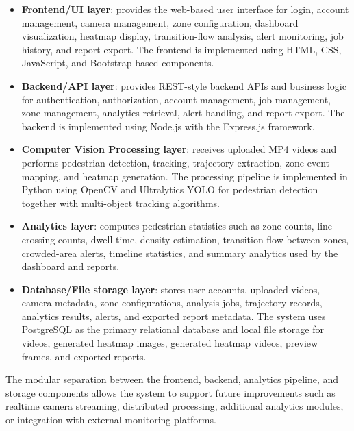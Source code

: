 \documentclass[12pt,a4paper]{report}
\begin{document}
\begin{itemize}

    \item \textbf{Frontend/UI layer}: provides the web-based user interface for login, account management, camera management, zone configuration, dashboard visualization, heatmap display, transition-flow analysis, alert monitoring, job history, and report export. The frontend is implemented using HTML, CSS, JavaScript, and Bootstrap-based components.

    \item \textbf{Backend/API layer}: provides REST-style backend APIs and business logic for authentication, authorization, account management, job management, zone management, analytics retrieval, alert handling, and report export. The backend is implemented using Node.js with the Express.js framework.

    \item \textbf{Computer Vision Processing layer}: receives uploaded MP4 videos and performs pedestrian detection, tracking, trajectory extraction, zone-event mapping, and heatmap generation. The processing pipeline is implemented in Python using OpenCV and Ultralytics YOLO for pedestrian detection together with multi-object tracking algorithms.

    \item \textbf{Analytics layer}: computes pedestrian statistics such as zone counts, line-crossing counts, dwell time, density estimation, transition flow between zones, crowded-area alerts, timeline statistics, and summary analytics used by the dashboard and reports.

    \item \textbf{Database/File storage layer}: stores user accounts, uploaded videos, camera metadata, zone configurations, analysis jobs, trajectory records, analytics results, alerts, and exported report metadata. The system uses PostgreSQL as the primary relational database and local file storage for videos, generated heatmap images, generated heatmap videos, preview frames, and exported reports.

\end{itemize}

The modular separation between the frontend, backend, analytics pipeline, and storage components allows the system to support future improvements such as realtime camera streaming, distributed processing, additional analytics modules, or integration with external monitoring platforms.
\end{document}
